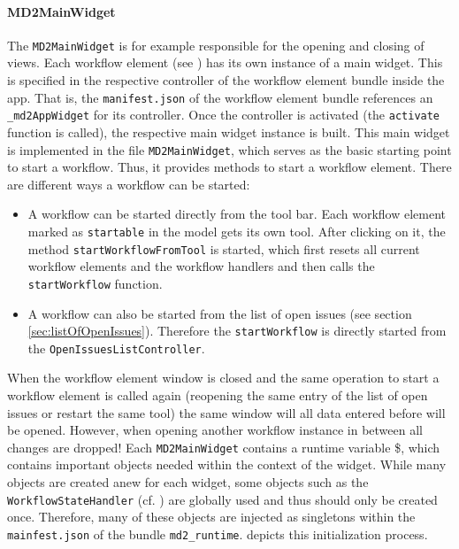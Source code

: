 \paragraph{MD2MainWidget}
The \lstinline!MD2MainWidget! is for example responsible for the opening and closing of views. 
Each workflow element (see ) has its own instance of a \MD main widget. This is specified in the respective controller of the workflow element bundle inside the app. That is, the \lstinline!manifest.json! of the workflow element bundle references an \lstinline!_md2AppWidget! for its controller. Once the controller is activated (\ie the \lstinline!activate! function is called), the respective \MD main widget instance is built. This \MD main widget is implemented in the file \lstinline!MD2MainWidget!, which serves as the basic starting point to start a workflow. Thus, it provides methods to start a workflow element. There are different ways a workflow can be started:
\begin{itemize}
	\item A workflow can be started directly from the \mapapps tool bar. Each workflow element marked as \lstinline|startable| in the model gets its own tool. After clicking on it, the method \lstinline|startWorkflowFromTool| is started, which first resets all current workflow elements and the workflow handlers and then calls the \lstinline|startWorkflow| function.
	\item A workflow can also be started from the list of open issues (see section \ref{sec:listOfOpenIssues}). Therefore the \lstinline|startWorkflow| is directly started from the \lstinline|OpenIssuesListController|.
\end{itemize}
When the workflow element window is closed and the same operation to start a workflow element is called again (reopening the same entry of the list of open issues or restart the same tool) the same window will all data entered before will be opened. 
However, when opening another workflow instance in between all changes are dropped!
Each \lstinline|MD2MainWidget| contains a runtime variable \$, which contains important objects needed within the context of the widget. While many objects are created anew for each widget, some objects such as the \lstinline|WorkflowStateHandler| (cf. ) are globally used and thus should only be created once. Therefore, many of these objects are injected as singletons within the \lstinline|mainfest.json| of the bundle \lstinline|md2_runtime|.
 depicts this initialization process.

